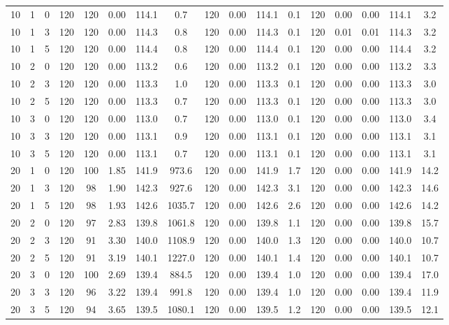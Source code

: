 \documentclass[3p, authoryear, 11pt]{elsarticle}
\begin{document}
\begin{table}[H]
\begin{tabular}{cccc cccc cccc ccccc}
    10 & 1 & 0 & 120 & 120 & 0.00 & 114.1 & 0.7 & 120 & 0.00 & 114.1 & 0.1 & 120 & 0.00 & 0.00 & 114.1 & 3.2 \\
    10 & 1 & 3 & 120 & 120 & 0.00 & 114.3 & 0.8 & 120 & 0.00 & 114.3 & 0.1 & 120 & 0.01 & 0.01 & 114.3 & 3.2 \\
    10 & 1 & 5 & 120 & 120 & 0.00 & 114.4 & 0.8 & 120 & 0.00 & 114.4 & 0.1 & 120 & 0.00 & 0.00 & 114.4 & 3.2 \\
    \cmidrule{1-17}
    10 & 2 & 0 & 120 & 120 & 0.00 & 113.2 & 0.6 & 120 & 0.00 & 113.2 & 0.1 & 120 & 0.00 & 0.00 & 113.2 & 3.3 \\
    10 & 2 & 3 & 120 & 120 & 0.00 & 113.3 & 1.0 & 120 & 0.00 & 113.3 & 0.1 & 120 & 0.00 & 0.00 & 113.3 & 3.0 \\
    10 & 2 & 5 & 120 & 120 & 0.00 & 113.3 & 0.7 & 120 & 0.00 & 113.3 & 0.1 & 120 & 0.00 & 0.00 & 113.3 & 3.0 \\
    \cmidrule{1-17}
    10 & 3 & 0 & 120 & 120 & 0.00 & 113.0 & 0.7 & 120 & 0.00 & 113.0 & 0.1 & 120 & 0.00 & 0.00 & 113.0 & 3.4 \\
    10 & 3 & 3 & 120 & 120 & 0.00 & 113.1 & 0.9 & 120 & 0.00 & 113.1 & 0.1 & 120 & 0.00 & 0.00 & 113.1 & 3.1 \\
    10 & 3 & 5 & 120 & 120 & 0.00 & 113.1 & 0.7 & 120 & 0.00 & 113.1 & 0.1 & 120 & 0.00 & 0.00 & 113.1 & 3.1 \\
    \midrule
    20 & 1 & 0 & 120 & 100 & 1.85 & 141.9 & 973.6 & 120 & 0.00 & 141.9 & 1.7 & 120 & 0.00 & 0.00 & 141.9 & 14.2 \\
    20 & 1 & 3 & 120 & 98 & 1.90 & 142.3 & 927.6 & 120 & 0.00 & 142.3 & 3.1 & 120 & 0.00 & 0.00 & 142.3 & 14.6 \\
    20 & 1 & 5 & 120 & 98 & 1.93 & 142.6 & 1035.7 & 120 & 0.00 & 142.6 & 2.6 & 120 & 0.00 & 0.00 & 142.6 & 14.2 \\
    \cmidrule{1-17}
    20 & 2 & 0 & 120 & 97 & 2.83 & 139.8 & 1061.8 & 120 & 0.00 & 139.8 & 1.1 & 120 & 0.00 & 0.00 & 139.8 & 15.7 \\
    20 & 2 & 3 & 120 & 91 & 3.30 & 140.0 & 1108.9 & 120 & 0.00 & 140.0 & 1.3  & 120 & 0.00 & 0.00 & 140.0 & 10.7 \\
    20 & 2 & 5 & 120 & 91 & 3.19 & 140.1 & 1227.0 & 120 & 0.00 & 140.1 & 1.4 & 120 & 0.00 & 0.00 & 140.1 & 10.7 \\
    \cmidrule{1-17}
    20 & 3 & 0 & 120 & 100 & 2.69 & 139.4 & 884.5 & 120 & 0.00 & 139.4 & 1.0 & 120 & 0.00 & 0.00 & 139.4 & 17.0 \\
    20 & 3 & 3 & 120 & 96 & 3.22 & 139.4 & 991.8 & 120 & 0.00 & 139.4 & 1.0 & 120 & 0.00 & 0.00 & 139.4 & 11.9 \\
    20 & 3 & 5 & 120 & 94 & 3.65 & 139.5 & 1080.1 & 120 & 0.00 & 139.5 & 1.2 & 120 & 0.00 & 0.00 & 139.5 & 12.1 \\
    \midrule


\end{tabular}
\end{table}
\end{document}
